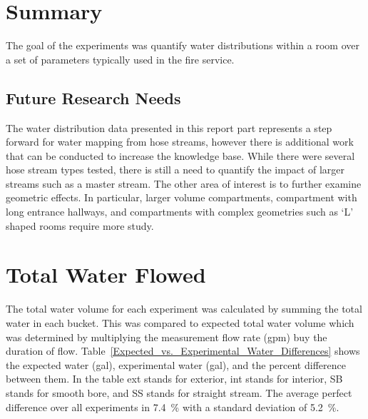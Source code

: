 \documentclass[12pt,oneside]{book}
\begin{document}
\chapter{Summary}

The goal of the experiments was quantify water distributions within a room over a set of parameters typically used in the fire service. 

\section{Future Research Needs}
The water distribution data presented in this report part represents a step forward for water mapping from hose streams, however there is additional work that can be conducted to increase the knowledge base. While there were several hose stream types tested, there is still a need to quantify the impact of larger streams such as a master stream. The other area of interest is to further examine geometric effects. In particular, larger volume compartments, compartment with long entrance hallways, and compartments with complex geometries such as `L' shaped rooms require more study.




\appendix

\chapter{Total Water Flowed}
\label{app:Water_Volume}

The total water volume for each experiment was calculated by summing the total water in each bucket. This was compared to expected total water volume which was determined by multiplying the measurement flow rate (gpm) buy the duration of flow. Table~\ref{Expected_vs._Experimental_Water_Differences} shows the expected water (gal), experimental water (gal), and the percent difference between them. In the table ext stands for exterior, int stands for interior, SB stands for smooth bore, and SS stands for straight stream. The average perfect difference over all experiments in 7.4~\% with a standard deviation of 5.2~\%.
\end{document}
